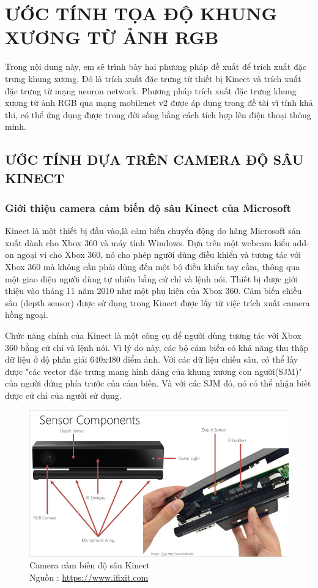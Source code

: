 \chapter{ƯỚC TÍNH TỌA ĐỘ KHUNG XƯƠNG TỪ ẢNH RGB}
\label{s:pose estimate}
Trong nội dung này, em sẽ trình bày hai phương pháp đề xuất để trích xuất đặc trưng khung xương. Đó là trích xuất đặc trưng từ thiết bị Kinect và trích xuất đặc trưng từ mạng neuron network. Phương pháp trích xuất đặc trưng khung xương từ ảnh RGB qua mạng mobilenet v2 được áp dụng trong đề tài vì tính khả thi, có thể ứng dụng được trong đời sống bằng cách tích hợp lên điện thoại thông minh.

\section{ƯỚC TÍNH DỰA TRÊN CAMERA ĐỘ SÂU KINECT}
\label{ss:kinect}
\subsection{Giới thiệu camera cảm biến độ sâu Kinect của Microsoft}
Kinect là một thiết bị đầu vào,là cảm biến chuyển động do hãng Microsoft sản xuất dành cho Xbox 360 và máy tính Windows. Dựa trên một webcam kiểu add-on ngoại vi cho Xbox 360, nó cho phép người dùng điều khiển và tương tác với Xbox 360 mà không cần phải dùng đến một bộ điều khiển tay cầm, thông qua một giao diện người dùng tự nhiên bằng cử chỉ và lệnh nói. Thiết bị được giới thiệu vào tháng 11 năm 2010 như một phụ kiện của Xbox 360. Cảm biến chiều sâu (depth sensor) được sử dụng trong Kinect được lấy từ việc trích xuất camera hồng ngoại. 

Chức năng chính của Kinect là một công cụ để người dùng tương tác với Xbox 360 bằng cử chỉ và lệnh nói. Vì lý do này, các bộ cảm biến có khả năng thu thập dữ liệu ở độ phân giải 640x480 điểm ảnh. Với các dữ liệu chiều sâu, có thể lấy được "các vector đặc trưng mang hình dáng của khung xương con người(SJM)" của người đứng phía trước của cảm biến. Và với các SJM đó, nó có thể nhận biết được cử chỉ của người sử dụng.

\FloatBarrier
\begin{figure}[htp]
\begin{center}
\includegraphics[scale=0.8]{chap3/c3_figs/kinect.png}
\end{center}
\caption{Camera cảm biến độ sâu Kinect \\Nguồn : \url{https://www.ifixit.com}}
\label{fig:kinect}
\end{figure}
\FloatBarrier

